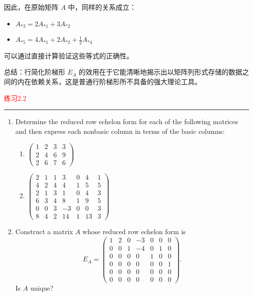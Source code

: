 因此，在原始矩阵 \( A \) 中，同样的关系成立：
\begin{itemize}
    \item \( A_{*3} = 2A_{*1} + 3A_{*2} \)
    \item \( A_{*5} = 4A_{*1} + 2A_{*2} + \frac{1}{2}A_{*4} \)
\end{itemize}

可以通过直接计算验证这些等式的正确性。

总结：行简化阶梯形 \( E_A \) 的效用在于它能清晰地揭示出以矩阵列形式存储的数据之间的内在依赖关系，这是普通行阶梯形所不具备的强大理论工具。

\textcolor{red}{练习2.2}
\color{red}\rule{\textwidth}{0.4pt}\color{black}

\begin{enumerate}[leftmargin=*, label=\bfseries 2.2.\arabic*]

\item Determine the reduced row echelon form for each of the following matrices and then express each nonbasic column in terms of the basic columns:
\begin{enumerate}[label=(\alph*)]
    \item \(\begin{pmatrix}
        1 & 2 & 3 & 3 \\
        2 & 4 & 6 & 9 \\
        2 & 6 & 7 & 6 
    \end{pmatrix}\)
    
    \item \(\begin{pmatrix}
        2 & 1 & 1 & 3 & 0 & 4 & 1 \\
        4 & 2 & 4 & 4 & 1 & 5 & 5 \\
        2 & 1 & 3 & 1 & 0 & 4 & 3 \\
        6 & 3 & 4 & 8 & 1 & 9 & 5 \\
        0 & 0 & 3 & -3 & 0 & 0 & 3 \\
        8 & 4 & 2 & 14 & 1 & 13 & 3 
    \end{pmatrix}\)
\end{enumerate}

\item Construct a matrix \( A \) whose reduced row echelon form is
\[
E_A = \begin{pmatrix}
1 & 2 & 0 & -3 & 0 & 0 & 0 \\
0 & 0 & 1 & -4 & 0 & 1 & 0 \\
0 & 0 & 0 & 0 & 1 & 0 & 0 \\
0 & 0 & 0 & 0 & 0 & 0 & 1 \\
0 & 0 & 0 & 0 & 0 & 0 & 0 \\
0 & 0 & 0 & 0 & 0 & 0 & 0 
\end{pmatrix}.
\]
Is \( A \) unique?


\end{enumerate}
